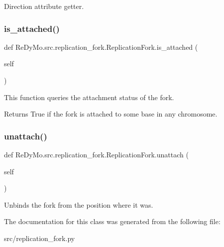 Direction attribute getter. 

\mbox{\label{classReDyMo_1_1src_1_1replication__fork_1_1ReplicationFork_a20750a4ee72864cc2f7126e53fd06410}} 
\subsubsection{\texorpdfstring{is\+\_\+attached()}{is\_attached()}}
{\footnotesize\ttfamily def Re\+Dy\+Mo.\+src.\+replication\+\_\+fork.\+Replication\+Fork.\+is\+\_\+attached (\begin{DoxyParamCaption}\item[{}]{self }\end{DoxyParamCaption})}



This function queries the attachment status of the fork. 

\begin{DoxyReturn}{Returns}
True if the fork is attached to some base in any chromosome. 
\end{DoxyReturn}
\mbox{\label{classReDyMo_1_1src_1_1replication__fork_1_1ReplicationFork_a093632b2000c853a2a7c5312c6c6916b}} 
\subsubsection{\texorpdfstring{unattach()}{unattach()}}
{\footnotesize\ttfamily def Re\+Dy\+Mo.\+src.\+replication\+\_\+fork.\+Replication\+Fork.\+unattach (\begin{DoxyParamCaption}\item[{}]{self }\end{DoxyParamCaption})}



Unbinds the fork from the position where it was. 



The documentation for this class was generated from the following file\+:\begin{DoxyCompactItemize}
\item 
src/replication\+\_\+fork.\+py\end{DoxyCompactItemize}
